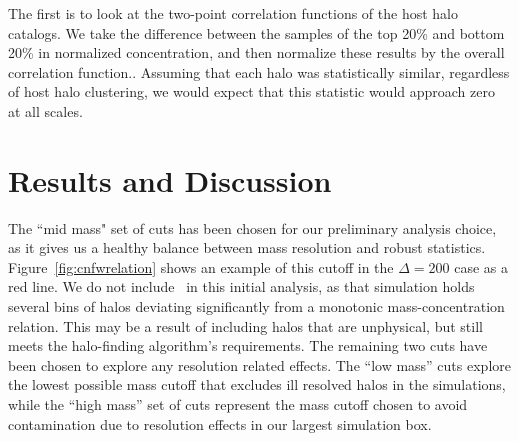 \documentclass[usenatbib,usegraphicx,letterpaper]{mn2e}
\begin{document}
The first is to look at the two-point correlation functions of the host halo catalogs. We take the difference between the samples of the top 20\% and bottom 20\% in normalized concentration, and then normalize these results by the overall correlation function.. Assuming that each halo was statistically similar, regardless of host halo clustering, we would expect that this statistic would approach zero at all scales.



\section[]{Results and Discussion}
\label{section:results}

The ``mid mass" set of cuts has been chosen for our preliminary analysis choice, as it gives us a healthy balance between mass resolution and robust statistics. Figure~\ref{fig:cnfwrelation} shows an example of this cutoff in the $\Delta = 200$ case as a red line. 
We do not include \simC \ in this initial analysis, as that simulation holds several bins of halos deviating significantly from a monotonic mass-concentration relation. This may be a result of including halos that are unphysical, but still meets the halo-finding algorithm's requirements.  The remaining two cuts have been chosen to explore any resolution related effects. The ``low mass'' cuts explore the lowest possible mass cutoff that excludes ill resolved halos in the \citet{diemer15} simulations, while the ``high mass'' set of cuts represent the mass cutoff chosen to avoid contamination due to resolution effects in our largest simulation box.
\end{document}

